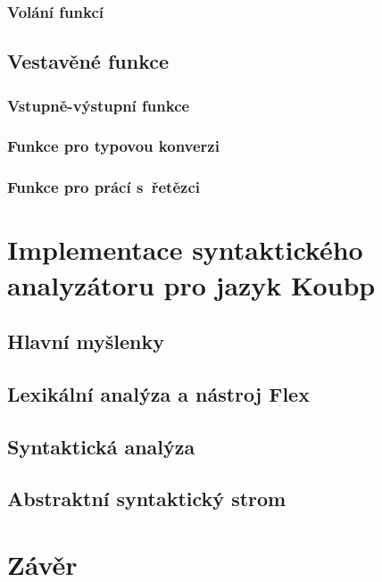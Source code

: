 \subsection*{Volání funkcí}

\section{Vestavěné funkce}

\subsection*{Vstupně-výstupní funkce}

\subsection*{Funkce pro typovou konverzi}

\subsection*{Funkce pro prácí s~řetězci}

\chapter{Implementace syntaktického analyzátoru pro jazyk Koubp }\label{7_implementace}

\section{Hlavní myšlenky}


\section{Lexikální analýza a nástroj Flex}
\section{Syntaktická analýza}
\section{Abstraktní syntaktický strom}


\chapter{Závěr}